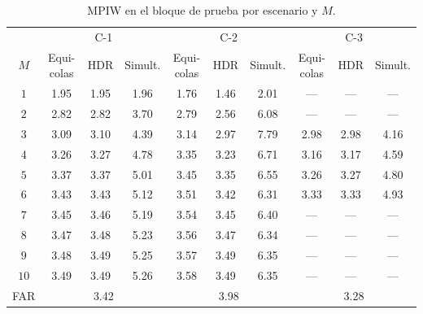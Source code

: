 \begin{table}[H]
\centering\small
\setlength{\tabcolsep}{4pt}
\caption{MPIW en el bloque de prueba por escenario y $M$.}
\label{tab:res_bloqueB_mpiw_por_M}
\begin{tabular}{c ccc ccc ccc}
\hline
 & \multicolumn{3}{c}{C-1} & \multicolumn{3}{c}{C-2} & \multicolumn{3}{c}{C-3} \\
$M$ & Equi-colas & HDR & Simult. & Equi-colas & HDR & Simult. & Equi-colas & HDR & Simult. \\
\hline
$1$ & 1.95 & 1.95 & 1.96 & 1.76 & 1.46 & 2.01 & --- & --- & --- \\
$2$ & 2.82 & 2.82 & 3.70 & 2.79 & 2.56 & 6.08 & --- & --- & --- \\
$3$ & 3.09 & 3.10 & 4.39 & 3.14 & 2.97 & 7.79 & 2.98 & 2.98 & 4.16 \\
$4$ & 3.26 & 3.27 & 4.78 & 3.35 & 3.23 & 6.71 & 3.16 & 3.17 & 4.59 \\
$5$ & 3.37 & 3.37 & 5.01 & 3.45 & 3.35 & 6.55 & 3.26 & 3.27 & 4.80 \\
$6$ & 3.43 & 3.43 & 5.12 & 3.51 & 3.42 & 6.31 & 3.33 & 3.33 & 4.93 \\
$7$ & 3.45 & 3.46 & 5.19 & 3.54 & 3.45 & 6.40 & --- & --- & --- \\
$8$ & 3.47 & 3.48 & 5.23 & 3.56 & 3.47 & 6.34 & --- & --- & --- \\
$9$ & 3.48 & 3.49 & 5.25 & 3.57 & 3.49 & 6.35 & --- & --- & --- \\
$10$ & 3.49 & 3.49 & 5.26 & 3.58 & 3.49 & 6.35 & --- & --- & --- \\
\hline
FAR & \multicolumn{3}{c}{3.42} & \multicolumn{3}{c}{3.98} & \multicolumn{3}{c}{3.28} \\
\hline
\end{tabular}
\end{table}

